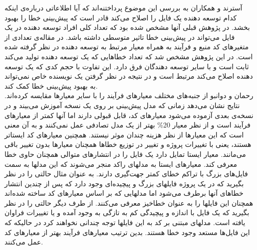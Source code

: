 آسترند و همکاران به بررسی این موضوع پرداختنه‌اند که آیا اطلاعاتی درباره‌ی اینکه کدام توسعه دهنده یک فایل را اصلاح می‌کند قادر است که پیش‌بینی خطا را بهبود بخشد. در پژوهش قبلی آنها\cite{weyuker2008too} مشخص شده بود که تعداد کلی   افراد توسعه دهنده در یک فایل می‌تواند در پیش‌بینی خطا تاثیر متوسطی داشته باشد. در  مقاله‌ی \cite{ostrand2010programmer}  تعدادی از متغیرهای کد منبع و فرآیند به همراه معیار مرتبط به توسعه دهنده در نظر گرفته شده است.  در این پژوهش مشخص شد  که تعداد خطاهایی که یک توسعه دهنده تولید می‌کند ثابت است و با سایر توسعه دهندگان فرق دارد. این تفاوت با  حجم کدی که یک توسعه دهنده اصلاح می‌کند مرتبط است و در نتیجه در نظر گرفتن یک نویسنده خاص نمی‌تواند به بهبود پیش‌بینی خطا کمک کند\cite{ostrand2010programmer}. \\

رحمان و دوانبو از جنبه‌های مختلف معیارهای فرآیند  را با سایر معیارها مقایسه کرده‌اند\cite{rahman2013and}. نتایج نشان می‌دهد  زمانی که مدل پیش‌بینی بر روی یک نسخه آموزش می‌بیند و در نسخه‌ی بعدی آزموده می‌شود معیارهای کد،  قابل قبولی دارند اما    آنها کمتر از معیارهای فرآیند است  و از نظر معیار 20\% 
بهتر از یک مدل تصادفی عمل نمی‌کنند و  به آن معنی است که این معیارها از نظر هزینه چندان  موثر نیستند. همچنین معیارهای کد ایستاتر هستند، ‌یعنی با تغییرات پروژه و تغییر در توزیع خطاها همچنان معیارها بدون تغییر باقی می‌مانند. معیار ایستا تمایل دارد یک فایل را در انتشارهای متوالی همچنان حاوی خطا معرفی کند. معیارهای ایستا به مدلهای راکد منجر می‌شوند که این مدلها به سمت فایل‌های بزرگ با تراکم خطای کمتر جهت‌گیری دارند. به عنوان مثال حالتی را در نظر بگیرید که در یک پروژه فایلهای بزرگ و پیچیده‌ای وجود دارد که پس از چندین انتشار خطاهای آنها برطرف می‌شود اما مدلهایی که بر اساس معیارهای کد ساخته شده‌اند همچنان این فایلها را به عنوان خطا‌خیز معرفی می‌کنند. از طرف دیگر حالتی را در نظر بگیرید که یک فایل با اندازه و پیچیدگی کم به تازگی به وجود آمده و یا تغییرات فراوان یافته است. مدلهای مبتنی بر کد به این فایلها توجه چندانی نخواهند کرد در حالیکه که این فایل‌ها مستعد وجود خطا هستند. بدین ترتیب معیارهای فرآیند بهتر از معیارهای کد عمل می‌کنند. 
 
 
